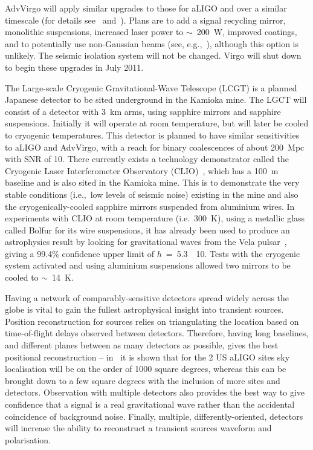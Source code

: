   
  
  AdvVirgo will apply similar upgrades to those for aLIGO and over a similar
timescale (for details see~\cite{AdvVirgoWhitepaper} and~\cite{AdvVirgoDesign}). Plans are
to add a signal recycling mirror, monolithic suspensions, increased laser power
to $\sim$~200~W, improved coatings, and to potentially use non-Gaussian beams (see,
e.g.,~\cite{Freise:2010}), although this option is unlikely. The seismic isolation
system will not be changed. Virgo will shut down to begin these upgrades in July
2011.


The Large-scale Cryogenic Gravitational-Wave Telescope (LCGT)
\cite{Miyoki:2005, Ohashi:2008, Kuroda:2010} is a planned Japanese detector to
be sited underground in the Kamioka mine. The LGCT will consist of a detector
with 3~km arms, using sapphire mirrors and sapphire suspensions. Initially it
will operate at room temperature, but will later be cooled to cryogenic
temperatures. This detector is planned to have similar sensitivities
to aLIGO and AdvVirgo, with a reach for binary coalescences of about 200~Mpc
with SNR of 10. There currently exists a technology demonstrator called the
Cryogenic Laser Interferometer Observatory (CLIO)~\cite{Yamamoto:2008, CLIOweb},
which has a 100~m baseline and is also sited in the Kamioka mine. This is to
demonstrate the very stable conditions (i.e.,\ low levels of seismic noise)
existing in the mine and also the cryogenically-cooled sapphire mirrors
suspended from aluminium wires. In experiments with CLIO at room temperature
(i.e.\, 300~K), using a metallic glass called Bolfur for its wire suspensions, it
has already been used to produce an astrophysics result by looking for
gravitational waves from the Vela pulsar~\cite{Akutsu:2008}, giving a 99.4\%
confidence upper limit of $h$~=~5.3~\texttimes~10. Tests with the cryogenic
system activated and using aluminium suspensions allowed two mirrors to be
cooled to $\sim$~14~K.


Having a network of comparably-sensitive detectors spread widely across the
globe is vital to gain the fullest astrophysical insight into transient sources.
Position reconstruction for sources relies on triangulating the location based
on time-of-flight delays observed between detectors. Therefore, having long
baselines, and different planes between as many detectors as possible, gives the
best positional reconstruction -- in~\cite{Fairhurst:2010} it is shown that for
the 2 US aLIGO sites sky localisation will be on the order of 1000 square degrees,
whereas this can be brought down to a few square degrees with the inclusion of
more sites and detectors. Observation with multiple detectors also provides the
best way to give confidence that a signal is a real gravitational wave rather
than the accidental coincidence of background noise. Finally, multiple,
differently-oriented, detectors will increase the ability to reconstruct a
transient sources waveform and polarisation.

